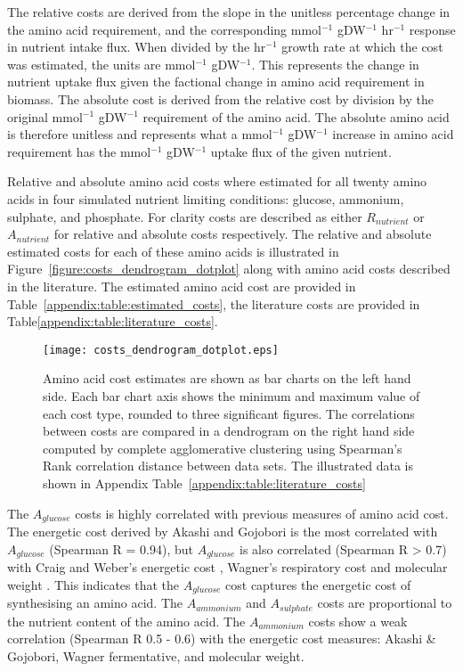 The relative costs are derived from the slope in the unitless percentage change in the amino acid requirement, and the corresponding mmol$^{-1}$ gDW$^{-1}$ hr$^{-1}$ response in nutrient intake flux. When divided by the hr$^{-1}$ growth rate at which the cost was estimated, the units are mmol$^{-1}$ gDW$^{-1}$. This represents the change in nutrient uptake flux given the factional change in amino acid requirement in biomass. The absolute cost is derived from the relative cost by division by the original mmol$^{-1}$ gDW$^{-1}$ requirement of the amino acid. The absolute amino acid is therefore unitless and represents what a mmol$^{-1}$ gDW$^{-1}$ increase in amino acid requirement has the mmol$^{-1}$ gDW$^{-1}$ uptake flux of the given nutrient.

Relative and absolute amino acid costs where estimated for all twenty amino acids in four simulated nutrient limiting conditions: glucose, ammonium, sulphate, and phosphate. For clarity costs are described as either $R_{nutrient}$ or $A_{nutrient}$ for relative and absolute costs respectively. The relative and absolute estimated costs for each of these amino acids is illustrated in Figure~\vref{figure:costs_dendrogram_dotplot} along with amino acid costs described in the literature. The estimated amino acid cost are provided in Table~\vref{appendix:table:estimated_costs}, the literature costs are provided in Table\vref{appendix:table:literature_costs}.

\begin{sidewaysfigure}
\centering
\texttt{[image: costs\_dendrogram\_dotplot.eps]}
\caption[Comparison of amino acid cost estimates]{Amino acid cost estimates are shown as bar charts on the left hand side. Each bar chart axis shows the minimum and maximum value of each cost type, rounded to three significant figures. The correlations between costs are compared in a dendrogram on the right hand side computed by complete agglomerative clustering using Spearman's Rank correlation distance between data sets. The illustrated data is shown in Appendix Table~\vref{appendix:table:literature_costs}}
\label{figure:costs_dendrogram_dotplot}
\end{sidewaysfigure}

The $A_{glucose}$ costs is highly correlated with previous measures of amino acid cost. The energetic cost derived by Akashi and Gojobori \cite{akashi2002} is the most correlated with $A_{glucose}$ (Spearman R = 0.94), but $A_{glucose}$ is also correlated (Spearman R > 0.7) with Craig and Weber's energetic cost \cite{craig1998}, Wagner's respiratory cost \cite{wagner2005} and molecular weight \cite{seligmann2005}. This indicates that the $A_{glucose}$ cost captures the energetic cost of synthesising an amino acid. The $A_{ammonium}$ and $A_{sulphate}$ costs are proportional to the nutrient content of the amino acid. The $A_{ammonium}$ costs show a weak correlation (Spearman R 0.5 - 0.6) with the energetic cost measures: Akashi \& Gojobori, Wagner fermentative, and molecular weight.

